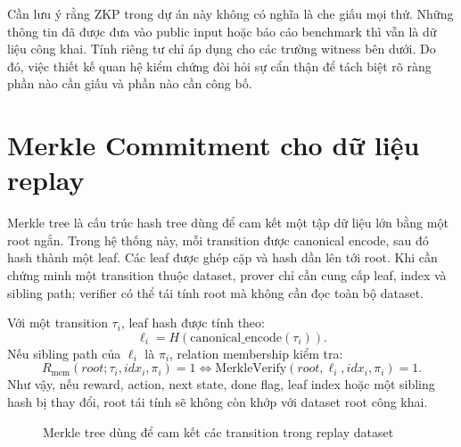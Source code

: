 \documentclass[12pt,a4paper,oneside]{report}
\begin{document}
Cần lưu ý rằng ZKP trong dự án này không có nghĩa là che giấu mọi thứ. Những thông tin đã được đưa vào public input hoặc báo cáo benchmark thì vẫn là dữ liệu công khai. Tính riêng tư chỉ áp dụng cho các trường witness bên dưới. Do đó, việc thiết kế quan hệ kiểm chứng đòi hỏi sự cẩn thận để tách biệt rõ ràng phần nào cần giấu và phần nào cần công bố.

\section{Merkle Commitment cho dữ liệu replay}

Merkle tree là cấu trúc hash tree dùng để cam kết một tập dữ liệu lớn bằng một root ngắn. Trong hệ thống này, mỗi transition được canonical encode, sau đó hash thành một leaf. Các leaf được ghép cặp và hash dần lên tới root. Khi cần chứng minh một transition thuộc dataset, prover chỉ cần cung cấp leaf, index và sibling path; verifier có thể tái tính root mà không cần đọc toàn bộ dataset.

Với một transition \(\tau_i\), leaf hash được tính theo:
\[
\ell_i = H(\text{canonical\_encode}(\tau_i)).
\]
Nếu sibling path của \(\ell_i\) là \(\pi_i\), relation membership kiểm tra:
\[
R_{\text{mem}}(root;\tau_i, idx_i,\pi_i)=1
\Longleftrightarrow
\text{MerkleVerify}(root,\ell_i,idx_i,\pi_i)=1.
\]
Như vậy, nếu reward, action, next state, done flag, leaf index hoặc một sibling hash bị thay đổi, root tái tính sẽ không còn khớp với dataset root công khai.

\begin{figure}[H]
\centering
{}
\caption{Merkle tree dùng để cam kết các transition trong replay dataset}
\end{figure}
\end{document}
